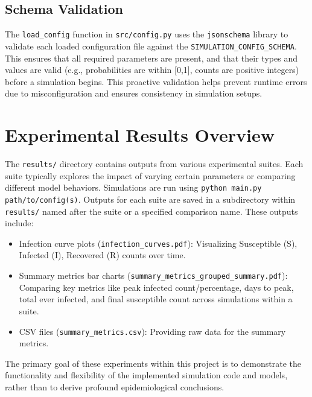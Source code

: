 \documentclass[12pt]{article}
\begin{document}
\subsection{Schema Validation}
The \texttt{load\_config} function in \texttt{src/config.py} uses the \texttt{jsonschema} library to validate each loaded configuration file against the \texttt{SIMULATION\_CONFIG\_SCHEMA}. This ensures that all required parameters are present, and that their types and values are valid (e.g., probabilities are within [0,1], counts are positive integers) before a simulation begins. This proactive validation helps prevent runtime errors due to misconfiguration and ensures consistency in simulation setups.

\section{Experimental Results Overview}
The \texttt{results/} directory contains outputs from various experimental suites. Each suite typically explores the impact of varying certain parameters or comparing different model behaviors. Simulations are run using \texttt{python main.py path/to/config(s)}. Outputs for each suite are saved in a subdirectory within \texttt{results/} named after the suite or a specified comparison name. These outputs include: \begin{itemize} \item Infection curve plots (\texttt{infection\_curves.pdf}): Visualizing Susceptible (S), Infected (I), Recovered (R) counts over time. \item Summary metrics bar charts (\texttt{summary\_metrics\_grouped\_summary.pdf}): Comparing key metrics like peak infected count/percentage, days to peak, total ever infected, and final susceptible count across simulations within a suite. \item CSV files (\texttt{summary\_metrics.csv}): Providing raw data for the summary metrics. \end{itemize} The primary goal of these experiments within this project is to demonstrate the functionality and flexibility of the implemented simulation code and models, rather than to derive profound epidemiological conclusions.
\end{document}
